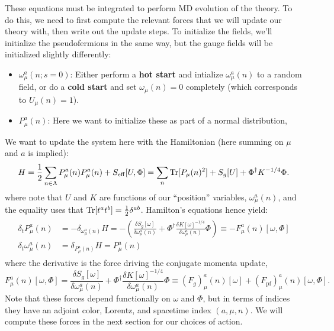 These equations must be integrated to perform MD evolution of the theory. To do this, we need to first compute the relevant forces that we will update our theory with, then write out the update steps. To initialize the fields, we'll initialize the pseudofermions in the same way, but the gauge fields will be initialized slightly differently:
\begin{itemize}
	\item $\omega_\mu^a(n; s = 0)$: Either perform a \textbf{hot start} and intialize $\omega_\mu^a(n)$ to a random field, or do a \textbf{cold start} and set $\omega_\mu(n) = 0$ completely (which corresponds to $U_\mu(n) = 1$).
	\item $P_\mu^a(n)$: Here we want to initialize these as part of a normal distribution, 
\end{itemize}

We want to update the system here with the Hamiltonian (here summing on $\mu$ and $a$ is implied):
\begin{equation}
	H = \frac{1}{2} \sum_{n\in\Lambda} P_\mu^a(n) P_\mu^a(n) + S_\mathrm{eff}[U, \Phi] = \sum_n \mathrm{Tr} [P_\mu(n)^2] + S_g[U] + \Phi^\dagger K^{-1/4} \Phi.
\end{equation}
where note that $U$ and $K$ are functions of our ``position'' variables, $\omega_\mu^a(n)$, and the equality uses that $\mathrm{Tr} [t^a t^b] = \frac{1}{2} \delta^{ab}$. Hamilton's equations hence yield:
\begin{align}\begin{split}
	\delta_t P_\mu^a(n) &= -\delta_{\omega_\mu^a(n)} H = - \left( \frac{\delta S_g[\omega]}{\delta\omega_\mu^a(n)} + \Phi^\dagger \frac{\delta K[\omega]^{-1/4}}{\delta \omega_\mu^a(n)} \Phi \right) \equiv - F_\mu^a(n)[\omega, \Phi] \\
	\delta_t \omega_\mu^a(n) &= \delta_{P_\mu^a(n)} H = P_\mu^a(n)
\end{split}\end{align}
where the derivative is the force driving the conjugate momenta update,
\begin{equation}
	F_\mu^a(n)[\omega, \Phi] = \frac{\delta S_g[\omega]}{\delta\omega_\mu^a(n)} + \Phi^\dagger \frac{\delta K[\omega]^{-1/4}}{\delta \omega_\mu^a(n)} \Phi \equiv (F_{g})_\mu^a(n)[\omega] + (F_\mathrm{pf})_\mu^a(n)[\omega, \Phi].
	\label{eq:driving_force_omegamu}
\end{equation}
Note that these forces depend functionally on $\omega$ and $\Phi$, but in terms of indices they have an adjoint color, Lorentz, and spacetime index $(a, \mu, n)$. 
We will compute these forces in the next section for our choices of action.

